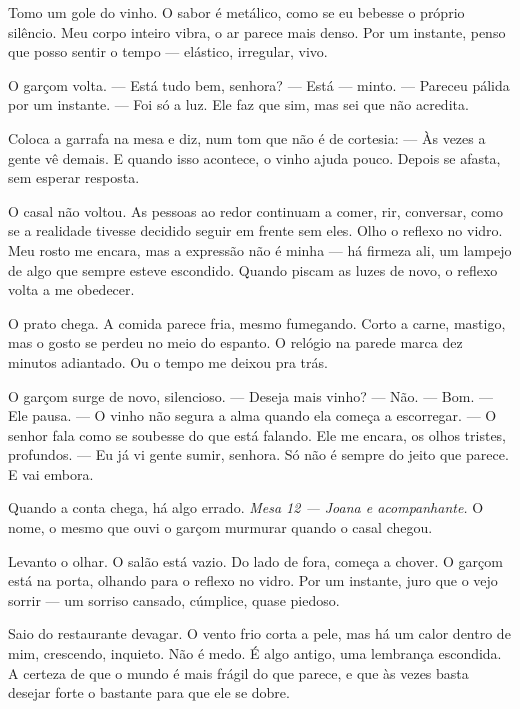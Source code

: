 \medskip

Tomo um gole do vinho.  
O sabor é metálico, como se eu bebesse o próprio silêncio.  
Meu corpo inteiro vibra, o ar parece mais denso.  
Por um instante, penso que posso sentir o tempo — elástico, irregular, vivo.

\medskip

O garçom volta.  
— Está tudo bem, senhora?
— Está — minto.
— Pareceu pálida por um instante.  
— Foi só a luz.
Ele faz que sim, mas sei que não acredita.

Coloca a garrafa na mesa e diz, num tom que não é de cortesia:  
— Às vezes a gente vê demais. E quando isso acontece, o vinho ajuda pouco.  
Depois se afasta, sem esperar resposta.

\medskip

O casal não voltou.  
As pessoas ao redor continuam a comer, rir, conversar, como se a realidade tivesse decidido seguir em frente sem eles.  
Olho o reflexo no vidro.  
Meu rosto me encara, mas a expressão não é minha — há firmeza ali, um lampejo de algo que sempre esteve escondido.  
Quando piscam as luzes de novo, o reflexo volta a me obedecer.

\medskip

O prato chega.  
A comida parece fria, mesmo fumegando.  
Corto a carne, mastigo, mas o gosto se perdeu no meio do espanto.  
O relógio na parede marca dez minutos adiantado.  
Ou o tempo me deixou pra trás.

\medskip

O garçom surge de novo, silencioso.  
— Deseja mais vinho?
— Não.
— Bom. — Ele pausa. — O vinho não segura a alma quando ela começa a escorregar.  
— O senhor fala como se soubesse do que está falando.  
Ele me encara, os olhos tristes, profundos.  
— Eu já vi gente sumir, senhora. Só não é sempre do jeito que parece.  
E vai embora.

\medskip

Quando a conta chega, há algo errado.  
\emph{Mesa 12 — Joana e acompanhante.}  
O nome, o mesmo que ouvi o garçom murmurar quando o casal chegou.

Levanto o olhar.  
O salão está vazio.  
Do lado de fora, começa a chover.  
O garçom está na porta, olhando para o reflexo no vidro.  
Por um instante, juro que o vejo sorrir — um sorriso cansado, cúmplice, quase piedoso.

\medskip

Saio do restaurante devagar.  
O vento frio corta a pele, mas há um calor dentro de mim, crescendo, inquieto.  
Não é medo.  
É algo antigo, uma lembrança escondida.  
A certeza de que o mundo é mais frágil do que parece, e que às vezes basta desejar forte o bastante para que ele se dobre.

